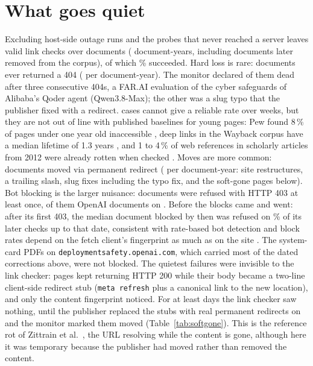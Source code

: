 \documentclass[10pt,a4paper]{article}
\begin{document}
\section{What goes quiet}
Excluding host-side outage runs and the \nTrackerErrorsValidRuns{} probes that never reached a server leaves
\nValidLinkChecks{} valid link checks over \nDocsWithValidChecks{} documents (\docYearsObserved{}
document-years, including documents later removed from the corpus), of which \shareLinkOk\% succeeded.
Hard loss is rare: \docsEverNotFoundWord{} documents ever returned a 404 (\notfoundDocsPerDocYear{} per
document-year). The monitor declared \nDeadWord{} of them dead after three consecutive 404s, a FAR.AI
evaluation of the cyber safeguards of Alibaba's Qoder agent (Qwen3.8-Max); the other was a slug typo that the publisher fixed with a
redirect. \docsEverNotFoundWordCap{} cases cannot give a reliable rate over \trackingWeeks{} weeks, but they are not out of line with
published baselines for young pages: Pew found 8\,\% of pages under one year old inaccessible
\cite{pew2024}, deep links in the Wayback corpus have a median lifetime of 1.3 years \cite{garg2024}, and 1
to 4\,\% of web references in scholarly articles from 2012 were already rotten when checked
\cite{klein2014}. Moves are more common: \nMovedEvents{} documents
moved via permanent redirect (\movesPerDocYear{} per document-year: site restructures, a trailing slash, slug fixes
including the typo fix, and the soft-gone pages below). Bot blocking is the larger nuisance: \docsEverBlocked{} documents
were refused with HTTP 403 at least once, \topBlockedHostDocs{} of them OpenAI
documents on \topBlockedHost. Before \topHostAllBlockedSincePretty{} the blocks came and went: after its first 403, the median document blocked by then was refused on
\blockedPersistenceMedianPreStreak\% of its later checks up to that date, consistent with rate-based bot detection\blockStreakSentence{} and block
rates depend on the fetch client's fingerprint as much as on the site \cite{gundelach2026}. The system-card PDFs on
\texttt{deploymentsafety.openai.com}, which carried most of the dated corrections above, were not blocked. The
quietest failures were invisible to the link checker: \nSoftGoneWord{} pages kept returning HTTP 200 while
their body became a two-line client-side redirect stub (\texttt{meta refresh} plus a canonical link to the
new location), and only the content fingerprint noticed. For at least \softGoneDaysMin{} days the link
checker saw nothing, until the publisher replaced the stubs with real permanent redirects on
\softGoneResolvedPretty{} and the monitor marked them moved (Table~\ref{tab:softgone}). This is the reference
rot of Zittrain et al.\ \cite{zittrain2014}, the URL resolving while the content is gone, although here it
was temporary because the publisher had moved rather than removed the content.
\end{document}
